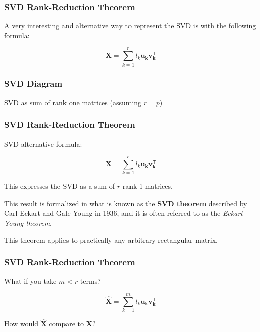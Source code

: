 \documentclass[12pt]{beamer}\usepackage[]{graphicx}\usepackage[]{color}
\begin{document}

\begin{frame}
\frametitle{SVD Rank-Reduction Theorem}

A very interesting and alternative way to represent the SVD is with the 
following formula:

{\Large
$$
\mathbf{X} = \sum_{k=1}^{r} l_k \mathbf{u_k} \mathbf{v_{k}^{\mathsf{T}}}
$$
}

\end{frame}


\begin{frame}
\frametitle{SVD Diagram}
\begin{center}

{\lolit SVD as sum of rank one matrices (assuming $r = p$)}
\end{center}
\end{frame}


\begin{frame}
\frametitle{SVD Rank-Reduction Theorem}

SVD alternative formula:

$$
\mathbf{X} = \sum_{k=1}^{r} l_k \mathbf{u_k} \mathbf{v_{k}^{\mathsf{T}}}
$$

\bi
  \item This expresses the SVD as a sum of $r$ rank-1 matrices.
  \item This result is formalized in what is known as the \textbf{SVD theorem} 
  described by Carl Eckart and Gale Young in 1936, and it is often referred to 
  as the \textit{Eckart-Young theorem}.
  \item This theorem applies to practically any arbitrary rectangular matrix. 
\ei

\end{frame}


\begin{frame}
\frametitle{SVD Rank-Reduction Theorem}

\begin{center}
What if you take $m < r$ terms?

{\large
$$
\mathbf{\hat{X}} = \sum_{k=1}^{m} l_k \mathbf{u_k} \mathbf{v_{k}^{\mathsf{T}}}
$$
}

{\lit How would $\mathbf{\hat{X}}$ compare to $\mathbf{X}$?}
\end{center}

\end{frame}
\end{document}
